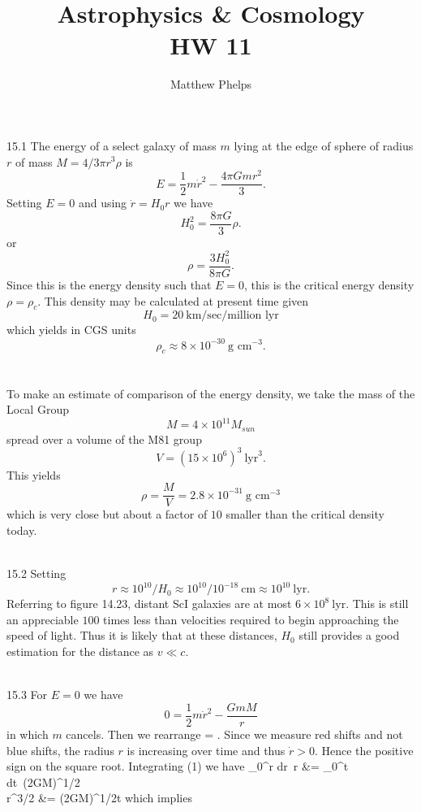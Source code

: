 \documentclass[10pt,letterpaper]{article}
\title{Astrophysics \& Cosmology\\HW 11}
\author{Matthew Phelps}
\date{}
\begin{document}
\maketitle

\benum

\item[15.1]
The energy of a select galaxy of mass $m$ lying at the edge of sphere of radius $r$ of mass $M = 4/3\pi r^3 \rho$ is
\[
	E = \frac12 m\dot r^2 - \frac{4\pi G m r^2}{3}.
\]
Setting $E=0$ and using $\dot r = H_0 r$ we have
\[
	H_0^2  = \frac{8\pi G}{3}\rho.
\]
or
\[
	\rho = \frac{3H_0^2}{8\pi G}.
\]
Since this is the energy density such that $E=0$, this is the critical energy density $\rho = \rho_c$. This density may be calculated at present time given 
\[
	H_0 = 20\ \text{km/sec/million lyr}
\]
which yields in CGS units
\[
	\rho_c \approx 8\times 10^{-30}\ \text{g cm}^{-3}.
\]
\\ \\
To make an estimate of comparison of the energy density, we take the mass of the Local Group 
\[
	M = 4\times 10^{11}M_{sun}
\]
spread over a volume of the M81 group
\[
	V= (15\times 10^6)^3\ \text{lyr}^3.
\]
This yields
\[
	\rho = \frac{M}{V} = 2.8\times 10^{-31}\ \text{g cm}^{-3}
\]
which is very close but about a factor of $10$ smaller than the critical density today. 
\\ \\
\item[15.2]
Setting
\[
	r \approx 10^{10}/H_0 \approx 10^{10}/10^{-18}\ \text{cm}\approx 10^{10}\ \text{lyr}.
\]
Referring to figure 14.23, distant ScI galaxies are at most $6\times 10^8 \ \text{lyr}$. This is still an appreciable $100$ times less than velocities required to begin approaching the speed of light. Thus it is likely that at these distances, $H_0$ still provides a good estimation for the distance as $v\ll c$. 
\\ \\
\item[15.3]
 For $E=0$ we have
\[
	0= \frac12 m\dot r^2 - \frac{ GmM}{r}
\]
in which $m$ cancels. Then we rearrange
\be
	 = .
\ee
Since we measure red shifts and not blue shifts, the radius $r$ is increasing over time and thus $\dot r>0$. Hence the positive sign on the square root. Integrating (1) we have
\ba	
	\int_0^r dr\ \sqrt r &= \int_0^t dt\ (2GM)^{1/2}\\
	 r^{3/2} &= (2GM)^{1/2}t
\ea
which implies
\end{document}
